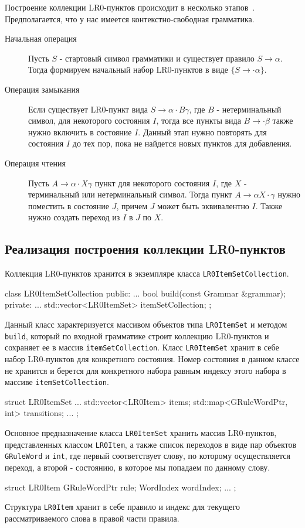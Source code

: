 Построение коллекции LR0-пунктов происходит в несколько этапов~\autocite{lr-parsing}. Предполагается, что у нас имеется контекстно-свободная грамматика.
\begin{description}
  \item[Начальная операция] Пусть $S$ - стартовый символ грамматики и существует правило $S \rightarrow \alpha$. Тогда формируем начальный набор LR0-пунктов в виде $\{ S \rightarrow \cdot\alpha \}$.
  \item[Операция замыкания] Если существует LR0-пункт вида $S \rightarrow \alpha\cdot{B}\gamma$, где $B$ - нетерминальный символ, для некоторого состояния $I$, тогда все пункты вида $B \rightarrow \cdot\beta$ также нужно включить в состояние $I$. Данный этап нужно повторять для состояния $I$ до тех пор, пока не найдется новых пунктов для добавления.
  \item[Операция чтения] Пусть $A \rightarrow \alpha\cdot{X}\gamma$ пункт для некоторого состояния $I$, где $X$ - терминальный или нетерминальный символ. Тогда пункт $A \rightarrow \alpha{X}\cdot\gamma$ нужно поместить в состояние $J$, причем $J$ может быть эквивалентно $I$. Также нужно создать переход из $I$ в $J$ по $X$.
\end{description}

\subsection{Реализация построения коллекции LR0-пунктов}
Коллекция LR0-пунктов хранится в экземпляре класса \lstinline{LR0ItemSetCollection}.
\begin{Verb}
class LR0ItemSetCollection {
public:
    ...
    bool build(const Grammar &grammar);
private:
    ...
    std::vector<LR0ItemSet> itemSetCollection;
};
\end{Verb}
Данный класс характеризуется массивом объектов типа \lstinline{LR0ItemSet} и методом \lstinline{build}, который по входной грамматике строит коллекцию LR0-пунктов и сохраняет ее в массив \lstinline{itemSetCollection}. Класс \lstinline{LR0ItemSet} хранит в себе набор LR0-пунктов для конкретного состояния. Номер состояния в данном классе не хранится и берется для конкретного набора равным индексу этого набора в массиве \lstinline{itemSetCollection}.
\begin{Verb}
struct LR0ItemSet {
    ...
    std::vector<LR0Item> items;
    std::map<GRuleWordPtr, int> transitions;
    ...
};
\end{Verb}
Основное предназначение класса \lstinline{LR0ItemSet} хранить массив LR0-пунктов, представленных классом \lstinline{LR0Item}, а также список переходов в виде пар объектов \lstinline{GRuleWord} и \lstinline{int}, где первый соответствует слову, по которому осуществляется переход, а второй - состоянию, в которое мы попадаем по данному слову.
\begin{Verb}
struct LR0Item {
    GRuleWordPtr rule;
    WordIndex wordIndex;
    ...
};
\end{Verb}
Структура \lstinline{LR0Item} хранит в себе правило и индекс для текущего рассматриваемого слова в правой части правила.

